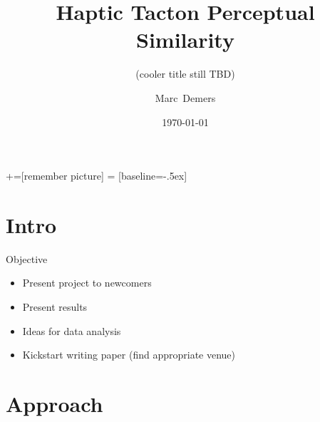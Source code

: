 \documentclass[table]{beamer}
\title[Haptic Tacton Similarity]{Haptic Tacton Perceptual Similarity} %
\subtitle[]{(cooler title still TBD)}
\author[Marc Demers]{Marc~Demers}
\institute[McGill University]
{
  \inst{}%
  McGill University, Montr\'{e}al, QC.
}
\date[]{\today}
\begin{document}
+=[remember picture]
 = [baseline=-.5ex]

\frame[plain]{
  \titlepage
}

\section{Intro} %

\begin{frame}{Objective}

  \begin{itemize}
  \item Present project to newcomers
  \item Present results
  \item Ideas for data analysis
  \item Kickstart writing paper (find appropriate venue)
  
  \end{itemize}

\end{frame}















\section{Approach}












% 









\end{document}
